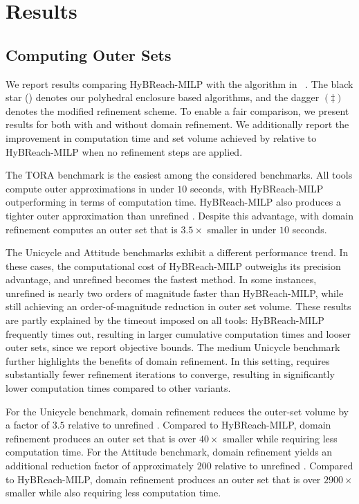 \documentclass[letterpaper, 10 pt, conference]{ieeeconf}  %
\begin{document}
\section{Results}
\subsection{Computing Outer Sets}
We report results comparing HyBReach-MILP with the \dripy algorithm in ~. The black star () denotes our polyhedral enclosure based algorithms, and the dagger $(\ddagger)$ denotes the modified refinement scheme.  To enable a fair comparison, we present results for \dripy both with and without domain refinement. We additionally report the improvement in computation time and set volume achieved by \dripy relative to HyBReach-MILP when no refinement steps are applied.

The TORA benchmark is the easiest among the considered benchmarks. All tools compute outer approximations in under $10$ seconds, with HyBReach-MILP outperforming \dripy in terms of computation time. HyBReach-MILP also produces a tighter outer approximation than unrefined \dripy. Despite this advantage, \dripy with domain refinement computes an outer set that is $3.5\times$ smaller in under $10$ seconds.

The Unicycle and Attitude benchmarks exhibit a different performance trend. In these cases, the computational cost of HyBReach-MILP outweighs its precision advantage, and unrefined \dripy becomes the fastest method. In some instances, unrefined \dripy is nearly two orders of magnitude faster than HyBReach-MILP, while still achieving an order-of-magnitude reduction in outer set volume. These results are partly explained by the timeout imposed on all tools: HyBReach-MILP frequently times out, resulting in larger cumulative computation times and looser outer sets, since we report objective bounds. The medium Unicycle benchmark further highlights the benefits of domain refinement. In this setting, \dripy requires substantially fewer refinement iterations to converge, resulting in significantly lower computation times compared to other variants.

For the Unicycle benchmark, domain refinement reduces the outer-set volume by a factor of $3.5$ relative to unrefined \dripy. Compared to HyBReach-MILP, domain refinement produces an outer set that is over $40\times$ smaller while requiring less computation time. 
For the Attitude benchmark, domain refinement yields an additional reduction factor of approximately $200$ relative to unrefined \dripy. Compared to HyBReach-MILP, domain refinement produces an outer set that is over $2900\times$ smaller while also requiring less computation time.
\end{document}
